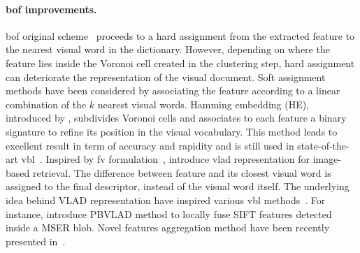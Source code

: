 \paragraph{\ac{bof} improvements.} \ac{bof} original scheme~\citep{Sivic2003} proceeds to a hard assignment from the extracted feature to the nearest visual word in the dictionary. However, depending on where the feature lies inside the Voronoi cell created in the clustering step, hard assignment can deteriorate the representation of the visual document. Soft assignment~\citep{Philbin2008} methods have been considered by associating the feature according to a linear combination of the $k$ nearest visual words. Hamming embedding (HE), introduced by \citet{Jegou2008}, subdivides Voronoi cells and associates to each feature a binary signature to refine its position in the visual vocabulary. This method leads to excellent result in term of accuracy and rapidity and is still used in state-of-the-art \ac{vbl}~\cite{Arandjelovic2014}. Inspired by \ac{fv} formulation~\citep{Perronnin2010}, \citet{Jegou2012} introduce \ac{vlad} representation for image-based retrieval. The difference between feature and its closest visual word is assigned to the final descriptor, instead of the visual word itself. The underlying idea behind VLAD representation have inspired various \ac{vbl} methods~\citep{Kim2015,Torii2015,Arandjelovic2017,Yan2016}. For instance, \citet{Kim2015} introduce PBVLAD method to locally fuse SIFT features detected inside a MSER blob. Novel features aggregation method have been recently presented in~\citep{Jegou2014}.
	
